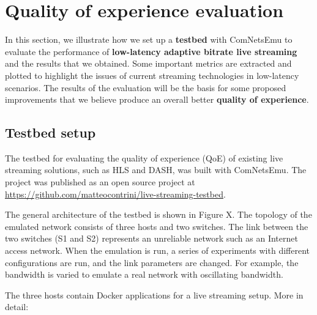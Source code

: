 \chapter{Quality of experience evaluation}
\label{cha:eval}

In this section, we illustrate how we set up a \textbf{testbed} with ComNetsEmu to evaluate the performance of \textbf{low-latency adaptive bitrate live streaming} and the results that we obtained. Some important metrics are extracted and plotted to highlight the issues of current streaming technologies in low-latency scenarios. The results of the evaluation will be the basis for some proposed improvements that we believe produce an overall better \textbf{quality of experience}.


\section{Testbed setup}
\label{sec:eval/testbed}

The testbed for evaluating the quality of experience (QoE) of existing live streaming solutions, such as HLS and DASH, was built with ComNetsEmu. The project was published as an open source project at \url{https://github.com/matteocontrini/live-streaming-testbed}.

The general architecture of the testbed is shown in Figure X. The topology of the emulated network consists of three hosts and two switches. The link between the two switches (S1 and S2) represents an unreliable network such as an Internet access network. When the emulation is run, a series of experiments with different configurations are run, and the link parameters are changed. For example, the bandwidth is varied to emulate a real network with oscillating bandwidth.

The three hosts contain Docker applications for a live streaming setup. More in detail:

